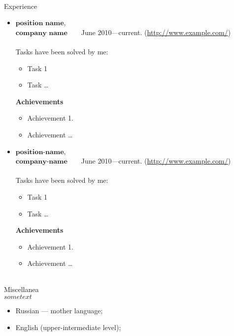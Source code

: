 \documentclass{article}
\begin{document}
\noindent \\ {\Large Experience}
\begin{itemize}
    \item 
    $\textbf{position name}$, \\
    $\textbf{company name}$~~~~June 2010---current. (\url{http://www.example.com/}) \\\\ 
    Tasks have been solved by me:
        \begin{itemize}
            \item Task 1
            \item Task \ldots
        \end{itemize}
    \textbf{Achievements}
        \begin{itemize}
            \item Achievement 1.
            \item Achievement \ldots
        \end{itemize}

    \item 
    $\textbf{position-name}$, \\
    $\textbf{company-name}$~~~~June 2010---current. (\url{http://www.example.com/}) \\\\ 
    Tasks have been solved by me:
        \begin{itemize}
            \item Task 1
            \item Task \ldots
        \end{itemize}
    \textbf{Achievements}
        \begin{itemize}
            \item Achievement 1.
            \item Achievement \ldots
        \end{itemize}
\end{itemize}


\noindent \\ {\Large Miscellanea}\\

 $sometext$\\

\begin{itemize}
    \item Russian --- mother language;
    \item English (upper-intermediate level);
\end{itemize}
\end{document}

